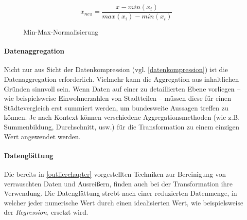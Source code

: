 \begin{figure}[H]
\begin{equation}
x_{neu} = \frac{x - min(x_i)}{max(x_i) - min(x_i)}
\end{equation}
\caption{Min-Max-Normalisierung}
\label{minmax}
\end{figure}

\paragraph{Datenaggregation}
Nicht nur aus Sicht der Datenkompression (vgl. \vref{datenkompression}) ist die Datenaggregation erforderlich. Vielmehr \glqq kann die Aggregation aus inhaltlichen Gründen sinnvoll sein.\grqq{} Wenn Daten auf einer zu detaillierten Ebene vorliegen -- wie beispielsweise Einwohnerzahlen von Stadtteilen -- müssen diese für einen Städtevergleich erst summiert werden, um bundesweite Aussagen treffen zu können. Je nach Kontext können verschiedene Aggregationsmethoden (wie z.B. Summenbildung, Durchschnitt, usw.) für die Transformation zu einem einzigen Wert angewendet werden.

\paragraph{Datenglättung}
Die bereits in \vref{outlierchapter} vorgestellten Techniken zur Bereinigung von verrauschten Daten und Ausreißern, finden auch bei der Transformation ihre Verwendung. Die Datenglättung strebt nach einer reduzierten Datenmenge, in welcher jeder numerische Wert durch einen idealisierten Wert, wie beispielsweise der \textit{Regression}, ersetzt wird.